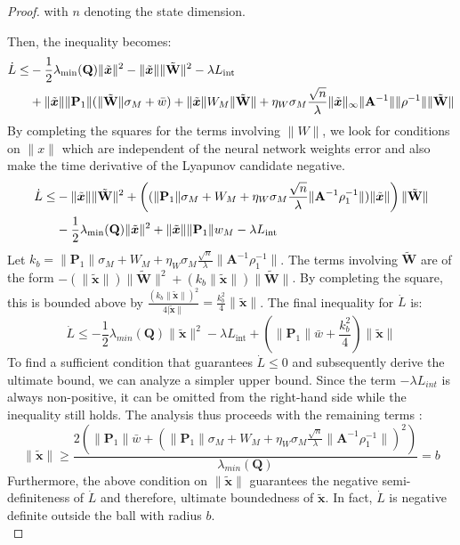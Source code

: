 \documentclass[11pt, a4paper]{article}
\newcommand{\xtilde}{\tilde{\bm{x}}}
\newcommand{\Wtilde}{\tilde{\mathbf{W}}}
\begin{document}
\begin{proof}
with $n$ denoting the state dimension.


Then, the inequality becomes:
\begin{align}
    \dot{L} \le 
    & -\frac{1}{2}\lambda_{\min}(\mathbf{Q})\|\xtilde\|^2 - \|\xtilde\|\|\Wtilde\|^2 - \lambda L_{\text{int}} \notag \\
    & + \|\xtilde\|\|\mathbf{P}_1\|(\|\Wtilde\| \sigma_{M} + \bar{w}) + \|\xtilde\| W_M \|\Wtilde\| 
    + \eta_W \sigma_M \frac{\sqrt{n}}{\lambda}\|\xtilde\|_\infty \|\mathbf{A}^{-1}\| \|\rho^{-1}\| \|\Wtilde\|
    \label{eq:Ldot_ineq_full}
\end{align}
By completing the squares for the terms involving $\|\hat{W}\|$, we look for conditions on $\|x\|$ which are independent of the neural network weights error and also make the time derivative of the Lyapunov candidate negative.
\begin{align*}
    \dot{L} \le & - \|\xtilde\| \|\Wtilde\|^2 
    + \left( (\|\mathbf{P}_1\|\sigma_M + W_M + \eta_W\sigma_M \frac{\sqrt{n}}{\lambda} \|\mathbf{A}^{-1}\rho_1^{-1}\|)\|\xtilde\| \right) \|\Wtilde\| \notag \\
    & - \frac{1}{2}\lambda_{\min}(\mathbf{Q})\|\xtilde\|^2 
    + \|\xtilde\|\|\mathbf{P}_1\|w_M 
    - \lambda L_{\text{int}}
\end{align*}
Let $k_b = \|\mathbf{P}_1\|\sigma_M + W_M + \eta_W\sigma_M \frac{\sqrt{n}}{\lambda} \|\mathbf{A}^{-1}\rho_1^{-1}\|$. The terms involving $\Wtilde$ are of the form $-(\|\xtilde\|)\|\Wtilde\|^2 + (k_b\|\xtilde\|)\|\Wtilde\|$. By completing the square, this is bounded above by $\frac{(k_b\|\xtilde\|)^2}{4|\xtilde\|} = \frac{k_b^2}{4}\|\xtilde\|$.
The final inequality for $\dot{L}$ is:
\begin{equation}
    \dot{L} \le -\frac{1}{2}\lambda_{min}(\mathbf{Q})\|\xtilde\|^2 - \lambda L_{\text{int}}+ \left( \|\mathbf{P}_1\|\bar{w} + \frac{k_b^2}{4} \right)\|\xtilde\|
\end{equation}
To find a sufficient condition that guarantees $\dot{L} \le 0$ and subsequently derive the ultimate bound, we can analyze a simpler upper bound. Since the term $-\lambda L_{int}$ is always non-positive, it can be omitted from the right-hand side while the inequality still holds. The analysis thus proceeds with the remaining terms :
\begin{equation}
    \|\xtilde\|\ge\frac{2\left( \|\mathbf{P}_1\|\bar{w} +(\|\mathbf{P}_1\|\sigma_M + W_M + \eta_W\sigma_M \frac{\sqrt{n}}{\lambda} \|\mathbf{A}^{-1}\rho_1^{-1}\|)^2 \right)}{\lambda_{min}(\mathbf{Q})}=b
\end{equation}
Furthermore, the above condition on $\|\xtilde\|$ guarantees the negative semi-definiteness of $\dot{L}$ and therefore, ultimate boundedness of $\xtilde$.
In fact, $\dot{L}$ is negative definite outside the ball with radius $b$.\\ 

\end{proof}
\end{document}
